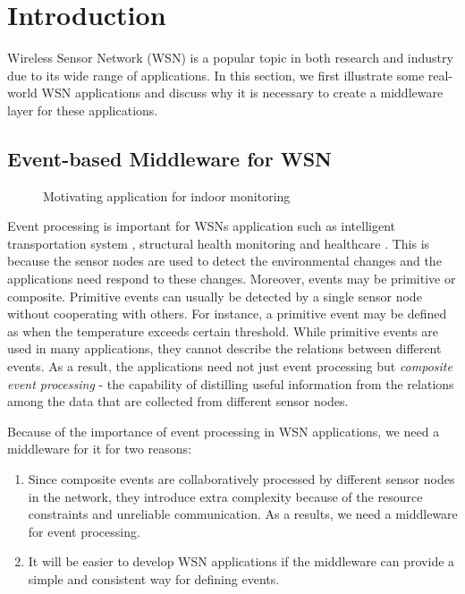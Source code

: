 \section{Introduction}
\label{sec:introduction}
Wireless Sensor Network (WSN) is a popular topic in both research and industry due to its wide range of applications. In this section, we first illustrate some real-world WSN applications and discuss why it is necessary to create a middleware layer for these applications.

\subsection{Event-based Middleware for WSN}

\begin{figure}
\centering
{}
\caption{Motivating application for indoor monitoring}
\label{fig:rooms}
\end{figure}

Event processing is important for WSNs application such as intelligent transportation system \cite{klein:its}, structural health monitoring \cite{lynch:shm} and healthcare \cite{lo:ban}. This is because the sensor nodes are used to detect the environmental changes and the applications need respond to these changes. Moreover, events may be primitive or composite. Primitive events can usually be detected by a single sensor node without cooperating with others. For instance, a primitive event may be defined as when the temperature exceeds certain threshold. While primitive events are used in many applications, they cannot describe the relations between different events. As a result, the applications need not just event processing but \emph{composite event processing} - the capability of distilling useful information from the relations among the data that are collected from different sensor nodes.

Because of the importance of event processing in WSN applications, we need a middleware for it for two reasons:
\begin{enumerate}
\item Since composite events are collaboratively processed by different sensor nodes in the network, they introduce extra complexity because of the resource constraints and unreliable communication. As a results, we need a middleware for event processing.
\item It will be easier to develop WSN applications if the middleware can provide a simple and consistent way for defining events.
\end{enumerate}

